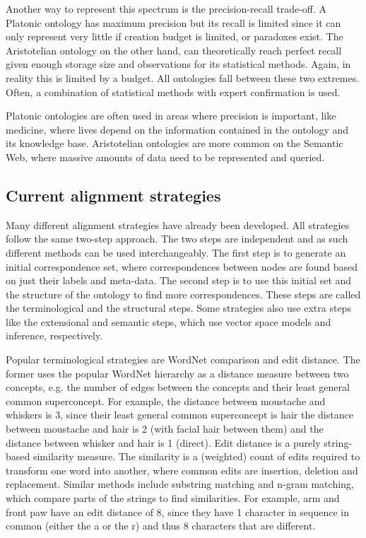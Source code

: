 \documentclass{article}
\begin{document}
 Another way to represent this spectrum is the precision-recall trade-off. A Platonic ontology has maximum precision but its recall is limited since it can only represent very little if creation budget is limited, or paradoxes exist. The Aristotelian ontology on the other hand, can theoretically reach perfect recall given enough storage size and observations for its statistical methods. Again, in reality this is limited by a budget. All ontologies fall between these two extremes. Often, a combination of statistical methods with expert confirmation is used.
 
 Platonic ontologies are often used in areas where precision is important, like medicine, where lives depend on the information contained in the ontology and its knowledge base. Aristotelian ontologies are more common on the Semantic Web, where massive amounts of data need to be represented and queried.
 
 \subsection{Current alignment strategies} \label{strategies}
 Many different alignment strategies have already been developed. All strategies follow the same two-step approach. The two steps are independent and as such different methods can be used interchangeably. The first step is to generate an initial correspondence set, where correspondences between nodes are found based on just their labels and meta-data. The second step is to use this initial set and the structure of the ontology to find more correspondences. These steps are called the terminological and the structural steps. Some strategies also use extra steps like the extensional and semantic steps, which use vector space models and inference, respectively\cite{matchingchallenges}.
 
 Popular terminological strategies are WordNet comparison and edit distance. The former uses the popular WordNet hierarchy as a distance measure between two concepts, e.g. the number of edges between the concepts and their least general common superconcept\cite{lin2008}.
 For example, the distance between moustache and whiskers is 3, since their least general common superconcept is hair the distance between moustache and hair is 2 (with facial hair between them) and the distance between whisker and hair is 1 (direct).
 Edit distance is a purely string-based similarity measure. The similarity is a (weighted) count of edits required to transform one word into another, where common edits are insertion, deletion and replacement. Similar methods include substring matching and n-gram matching, which compare parts of the strings to find similarities\cite{singh2014, levenshtein}.
 For example, arm and front paw have an edit distance of 8, since they have 1 character in sequence in common (either the a or the r) and thus 8 characters that are different.
\end{document}
